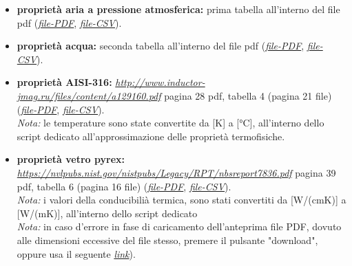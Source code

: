 \documentclass[a4paper,10pt]{article}                                                                                       %
\begin{document}
  \begin{itemize}                                                                                                           %
    \item \textbf{proprietà aria a pressione atmosferica:}
      prima tabella all'interno del file pdf
      (\textit{\href{https://github.com/CristianMerli/DataAnalysis/blob/master/lab_doc/TabelleAriaAcqua.pdf}{file-PDF}},
      \textit{\href{https://github.com/CristianMerli/DataAnalysis/blob/master/data_analysis/thermophys_vars/air_atmp_thermo_vars.csv}{file-CSV}}).
    \item \textbf{proprietà acqua:}
      seconda tabella all'interno del file pdf
      (\textit{\href{https://github.com/CristianMerli/DataAnalysis/blob/master/lab_doc/TabelleAriaAcqua.pdf}{file-PDF}},
      \textit{\href{https://github.com/CristianMerli/DataAnalysis/blob/master/data_analysis/thermophys_vars/water_thermo_vars.csv}{file-CSV}}).
    \item \textbf{proprietà AISI-316:}
      \textit{\href{http://www.inductor-jmag.ru/files/content/a129160.pdf}{http://www.inductor-jmag.ru/files/content/a129160.pdf}}
      pagina 28 pdf, tabella 4 (pagina 21 file)
      (\textit{\href{https://github.com/CristianMerli/DataAnalysis/blob/master/lab_doc/AISI316.pdf}{file-PDF}},
      \textit{\href{https://github.com/CristianMerli/DataAnalysis/blob/master/data_analysis/thermophys_vars/aisi_316_thermo_vars.csv}{file-CSV}}).
      \vspace{1.5mm}\\\textit{Nota:} le temperature sono state convertite da [K] a [°C], all'interno dello script dedicato
      all'approssimazione delle proprietà termofisiche.
    \item \textbf{proprietà vetro pyrex:}
      \textit{\href{https://nvlpubs.nist.gov/nistpubs/Legacy/RPT/nbsreport7836.pdf}{https://nvlpubs.nist.gov/nistpubs/Legacy/RPT/nbsreport7836.pdf}}
      pagina 39 pdf, tabella 6 (pagina 16 file)
      (\textit{\href{https://github.com/CristianMerli/DataAnalysis/blob/master/lab_doc/Pyrex_glass.pdf}{file-PDF}},
      \textit{\href{https://github.com/CristianMerli/DataAnalysis/blob/master/data_analysis/thermophys_vars/pyrex_glass_thermo_vars.csv}{file-CSV}}).
      \vspace{1.5mm}\\\textit{Nota:} i valori della conducibilià termica, sono stati convertiti da [W/(cm\*K)] a [W/(m\*K)],
      all'interno dello script dedicato
      \vspace{1.5mm}\\\textit{Nota:} in caso d'errore in fase di caricamento dell'anteprima file PDF, dovuto alle
      dimensioni eccessive del file stesso, premere il pulsante "download", oppure usa il seguente
      \textit{\href{https://github.com/CristianMerli/DataAnalysis/raw/master/lab_doc/Pyrex_glass.pdf}{link}}).
  \end{itemize}                                                                                                             %
\end{document}
